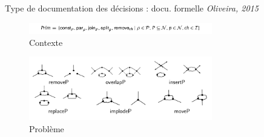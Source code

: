 \begin{frame}[fragile]{Type de documentation des décisions : docu. formelle
\emph{Oliveira, 2015}}
\centering
\begin{figure}
\includegraphics[width=8cm]{imgs/slide_oliveira_primitive.png}
\caption{Contexte}
\end{figure}
\begin{figure}
\includegraphics[width=8cm]{imgs/slide_oliveira_patron.png}
\caption{Problème}
\end{figure}
\begin{table}[]
\end{table}
\end{frame}

